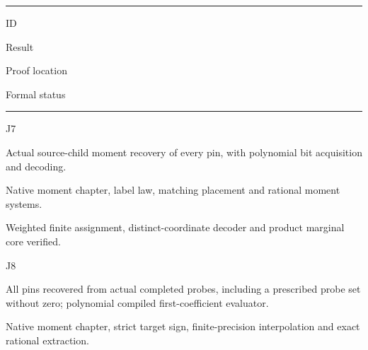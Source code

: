 \documentclass[11pt,a4paper]{article}
\newlength{\OfflineResearchTableWidth}
\newcommand{\OfflineResearchHeaderRule}{\noindent\rule{\linewidth}{0.45pt}\par}
\newcommand{\OfflineResearchRow}{\par}
\newenvironment{OfflineResearchTable}{%
  \par\medskip\begingroup\small\setlength{\parindent}{0pt}%
  \setlength{\parskip}{3pt plus 1pt minus .5pt}%
  \setlength{\OfflineResearchTableWidth}{\linewidth}%
}{%
  \par\endgroup\medskip%
}
\begin{document}
\begin{OfflineResearchTable}
\OfflineResearchHeaderRule
\noindent%
\begin{minipage}[t]{0.06615\OfflineResearchTableWidth}\raggedright
ID
\end{minipage}\hfill%
\begin{minipage}[t]{0.27405\OfflineResearchTableWidth}\raggedright
Result
\end{minipage}\hfill%
\begin{minipage}[t]{0.29295\OfflineResearchTableWidth}\raggedright
Proof location
\end{minipage}\hfill%
\begin{minipage}[t]{0.31185\OfflineResearchTableWidth}\raggedright
Formal status
\end{minipage}%
\OfflineResearchRow
\nobreak
\OfflineResearchHeaderRule
\nobreak
\noindent%
\begin{minipage}[t]{0.06615\OfflineResearchTableWidth}\raggedright
J7
\end{minipage}\hfill%
\begin{minipage}[t]{0.27405\OfflineResearchTableWidth}\raggedright
Actual source-child moment recovery of every pin, with polynomial
bit acquisition and decoding.
\end{minipage}\hfill%
\begin{minipage}[t]{0.29295\OfflineResearchTableWidth}\raggedright
Native moment chapter, label law,
matching placement and rational moment systems.
\end{minipage}\hfill%
\begin{minipage}[t]{0.31185\OfflineResearchTableWidth}\raggedright
Weighted finite
assignment, distinct-coordinate decoder and product marginal core
verified.
\end{minipage}%
\OfflineResearchRow
\noindent%
\begin{minipage}[t]{0.06615\OfflineResearchTableWidth}\raggedright
J8
\end{minipage}\hfill%
\begin{minipage}[t]{0.27405\OfflineResearchTableWidth}\raggedright
All pins recovered from actual completed probes, including a
prescribed probe set without zero; polynomial compiled first-coefficient
evaluator.
\end{minipage}\hfill%
\begin{minipage}[t]{0.29295\OfflineResearchTableWidth}\raggedright
Native moment chapter, strict target sign, finite-precision
interpolation and exact rational extraction.
\end{minipage}\hfill%

\end{OfflineResearchTable}
\end{document}
